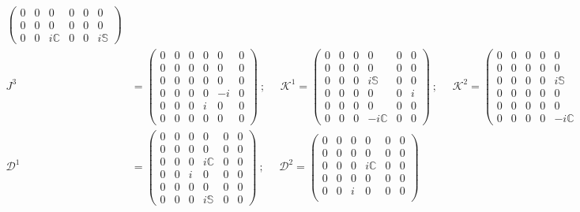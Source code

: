 \documentclass[]{article}
\numberwithin{equation}{section}
\begin{document}
{{\begin{align}
\begin{pmatrix}
        0&0&0&0&0&0\\
        0&0&0&0&0&0\\
        0&0&i\mathbb{C}&0&0&i\mathbb{S}
    \end{pmatrix}\nonumber\\
    J^3&=\begin{pmatrix}
    0&0&0&0&0&0\\
    0&0&0&0&0&0\\
    0&0&0&0&0&0\\
  0&0&0&0 & -i & 0\\
  0&0&0&i & 0 & 0\\
  0&0&0&0 & 0 & 0
\end{pmatrix}~;~~~~~~\mathcal{K}^{1}=\begin{pmatrix}
        0&0&0&0&0&0\\
        0&0&0&0&0&0\\
        0&0&0&i\mathbb{S}&0&0\\
        0&0&0&0&0&i\\
        0&0&0&0&0&0\\
        0&0&0&-i\mathbb{C}&0&0
    \end{pmatrix}~;~~~~~~\mathcal{K}^{2}=\begin{pmatrix}
        0&0&0&0&0&0\\
        0&0&0&0&0&0\\
        0&0&0&0&i\mathbb{S}&0\\
        0&0&0&0&0&0\\
        0&0&0&0&0&i\\
        0&0&0&0&-i\mathbb{C}&0
    \end{pmatrix}~;\nonumber\\
    \mathcal{D}^{1}&=\begin{pmatrix}
        0&0&0&0&0&0\\
        0&0&0&0&0&0\\
        0&0&0&i\mathbb{C}&0&0\\
        0&0&i&0&0&0\\
        0&0&0&0&0&0\\
        0&0&0&i\mathbb{S}&0&0
    \end{pmatrix}~;~~~~~~\mathcal{D}^{2}=\begin{pmatrix}
        0&0&0&0&0&0\\
        0&0&0&0&0&0\\
        0&0&0&i\mathbb{C}&0&0\\
        0&0&0&0&0&0\\
        0&0&i&0&0&0\\

\end{pmatrix}
\end{align}}}
\end{document}
